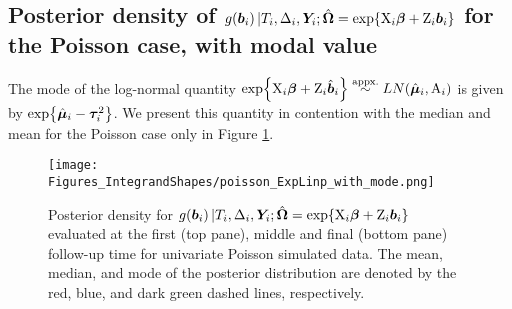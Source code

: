 \subsection{Posterior density of \texorpdfstring{$g\!\left(\bm{b}_i\right)|T_i,\Delta_i,\bm{Y}_i;\hat{\bm{\Omega}}=\exp\!\left\{\mathrm{X}_i\bm{\beta}+\mathrm{Z}_i\bm{b}_i\right\}$}{expeta} for the Poisson case, with modal value}\label{sec:appendix-suppfigs-integrands-mode}
The mode of the log-normal quantity $\exp\!\left\{\mathrm{X}_i\bm{\beta}+\mathrm{Z}_i\hat{\bm{b}}_i\right\}\overset{\text{appx.}}{\sim} LN\!\left(\hat{\bm{\mu}}_i,\mathrm{A}_i\right)$ is given by $\exp\!\left\{\hat{\bm{\mu}}_i-\bm{\tau}_i^2\right\}$. We present this quantity in contention with the median and mean for the Poisson case only in Figure \ref{fig:justification-integrands-poisson-Expeta-withmode}.
\begin{figure}[ht]
      \centering
      \texttt{[image: Figures\_IntegrandShapes/poisson\_ExpLinp\_with\_mode.png]}
      \caption{Posterior density for $g\!\left(\bm{b}_i\right)|T_i,\Delta_i,\bm{Y}_i;\hat{\bm{\Omega}}=\exp\!\left\{\mathrm{X}_i\bm{\beta}+\mathrm{Z}_i\bm{b}_i\right\}$ evaluated at the first (top pane), middle and final (bottom pane) follow-up time for univariate Poisson simulated data. The mean, median, and mode of the posterior distribution are denoted by the red, blue, and dark green dashed lines, respectively.}
      \label{fig:justification-integrands-poisson-Expeta-withmode}
\end{figure}
\clearpage

